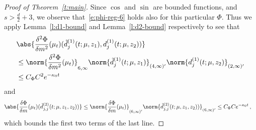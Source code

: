 \documentclass{amsart}
\begin{document}
\begin{proof}[Proof of Theorem~\ref{t:main}]
	Since $\cos$ and $\sin$ are bounded functions, and $s > \frac{d}{2}+3$, we observe that~\eqref{e:phi-reg-6} holds also for this particular $\Phi$. 
	Thus we apply Lemma~\ref{l:d1-bound} and Lemma~\ref{l:d2-bound} respectively to see that 
	\begin{align*}
		& \abs{\frac{\delta^2 \Phi}{\delta m^2}(\mu_t) (\tilde d^{(1)}_j(t;\mu,z_1), d^{(1)}_j(t;\mu,z_2))} \\
		& \le \norm{\frac{\delta^2 \Phi}{\delta m^2}(\mu_t)}_{6,\infty} \norm{\tilde d^{(1)}_j(t;\mu,z_1)}_{(4,\infty)'} \norm{d^{(1)}_j(t;\mu,z_2)}_{(2,\infty)'} \\
		& \le C_\Phi C^2 e^{-\kappa_0 t} 
	\end{align*}
	and 
	\begin{align*}
		\abs{\frac{\delta \Phi}{\delta m} (\mu_t) (\tilde d^{(2)}_{j,j}(t;\mu,z_1,z_2))} & \le \norm{\frac{\delta \Phi}{\delta m}(\mu_t)}_{(6,\infty)'} \norm{ \tilde d^{(2)}_{j,j}(t;\mu,z_1,z_2))}_{(6,\infty)'} \le C_\Phi C e^{-\kappa_0 t} \,,
	\end{align*}
	which bounds the first two terms of the last line. 
	

\end{proof}
\end{document}
